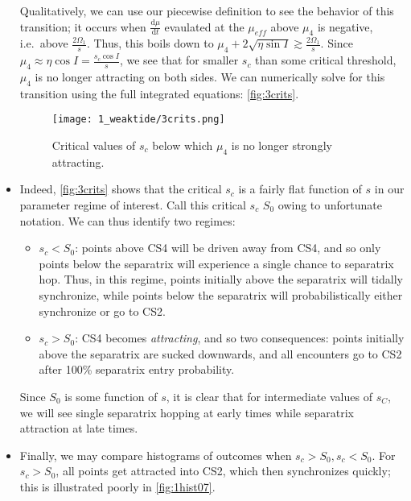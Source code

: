 \documentclass[11pt,
        usenames, %
        dvipsnames %
    ]{article}
\newcommand*{\rd}[2]{\frac{\mathrm{d}#1}{\mathrm{d}#2}}
\begin{document}
\begin{itemize}
        Qualitatively, we can use our piecewise definition to see the behavior
        of this transition; it occurs when $\rd{\mu}{t}$ evaulated at the
        $\mu_{eff}$ above $\mu_4$ is negative, i.e.\ above
        $\frac{2\Omega_1}{s}$. Thus, this boils down to $\mu_4 + 2\sqrt{\eta
        \sin I} \gtrsim \frac{2\Omega_1}{s}$. Since $\mu_4 \approx \eta \cos I
        = \frac{s_c\cos I}{s}$, we see that for smaller $s_c$ than some critical
        threshold, $\mu_4$ is no longer attracting on both sides. We can
        numerically solve for this transition using the full integrated
        equations: \autoref{fig:3crits}.
        \begin{figure}[t]
            \centering
            \texttt{[image: 1\_weaktide/3crits.png]}
            \caption{Critical values of $s_c$ below which $\mu_4$ is no longer
            strongly attracting.}\label{fig:3crits}
        \end{figure}

    \item Indeed, \autoref{fig:3crits} shows that the critical $s_c$ is a fairly
        flat function of $s$ in our parameter regime of interest. Call this
        critical $s_c$ $S_0$ owing to unfortunate notation. We can thus identify
        two regimes:
        \begin{itemize}
            \item $s_c < S_{0}$: points above CS4 will be driven away from CS4,
                and so only points below the separatrix will experience a single
                chance to separatrix hop. Thus, in this regime, points initially
                above the separatrix will tidally synchronize, while points
                below the separatrix will probabilistically either synchronize
                or go to CS2.

            \item $s_c > S_0$: CS4 becomes \emph{attracting}, and so two
                consequences: points initially above the separatrix are sucked
                downwards, and all encounters go to CS2 after 100\% separatrix
                entry probability.
        \end{itemize}
        Since $S_0$ is some function of $s$, it is clear that for intermediate
        values of $s_C$, we will see single separatrix hopping at early times
        while separatrix attraction at late times.

    \item Finally, we may compare histograms of outcomes when $s_c > S_0, s_c <
        S_0$. For $s_c > S_0$, all points get attracted into CS2, which then
        synchronizes quickly; this is illustrated poorly in
        \autoref{fig:1hist07}.


\end{itemize}
\end{document}
